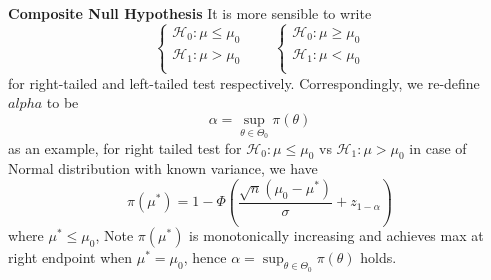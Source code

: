 \documentclass[11pt]{article}
\begin{document}
\begin{defn*}
  \textbf{Composite Null Hypothesis} It is more sensible to write
  \[
    \begin{cases*}
      \mathcal{H}_0: \mu \leq \mu_0 \\
      \mathcal{H}_1: \mu > \mu_0 \\
    \end{cases*}
    \quad \quad
    \begin{cases*}
      \mathcal{H}_0: \mu \geq \mu_0 \\
      \mathcal{H}_1: \mu < \mu_0 \\
    \end{cases*}
  \]
  for right-tailed and left-tailed test respectively. Correspondingly, we re-define $alpha$ to be
  \[
    \alpha = \sup_{\theta \in \Theta_0} \pi(\theta)
  \]
  as an example, for right tailed test for $\mathcal{H}_0: \mu \leq \mu_0$ vs $\mathcal{H}_1: \mu > \mu_0$ in case of Normal distribution with known variance, we have
  \[
    \pi(\mu^*) = 1 - \Phi\left( \frac{\sqrt{n}(\mu_0 - \mu^*)}{\sigma} + z_{1 - \alpha} \right)
  \]
  where $\mu^* \leq \mu_0$, Note $\pi(\mu^*)$ is monotonically increasing and achieves max at right endpoint when $\mu^* = \mu_0$, hence $\alpha = \sup_{\theta \in \Theta_0} \pi(\theta)$ holds.
\end{defn*}
\end{document}
